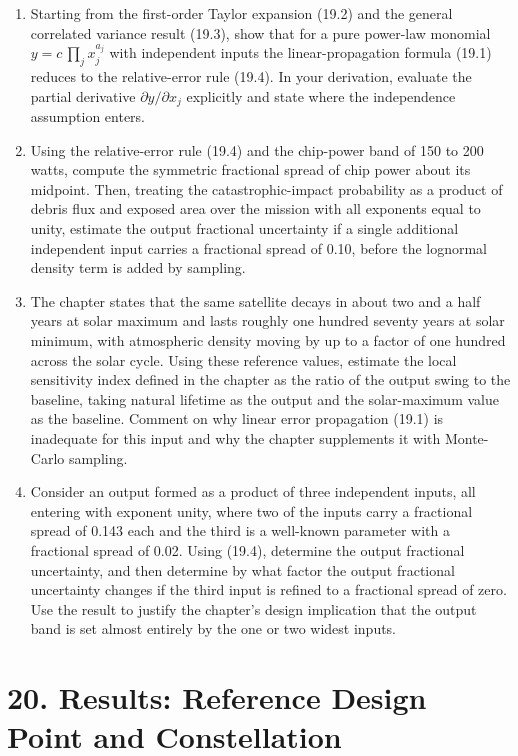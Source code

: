 \documentclass[
  11pt,
  openany,
  oneside]{book}
\begin{document}
\begin{enumerate}
\def\labelenumi{\arabic{enumi}.}
\item
  Starting from the first-order Taylor expansion (19.2) and the general
  correlated variance result (19.3), show that for a pure power-law
  monomial \(y = c\,\prod_{j} x_j^{a_j}\) with independent inputs the
  linear-propagation formula (19.1) reduces to the relative-error rule
  (19.4). In your derivation, evaluate the partial derivative
  \(\partial y/\partial x_j\) explicitly and state where the
  independence assumption enters.
\item
  Using the relative-error rule (19.4) and the chip-power band of 150 to
  200 watts, compute the symmetric fractional spread of chip power about
  its midpoint. Then, treating the catastrophic-impact probability as a
  product of debris flux and exposed area over the mission with all
  exponents equal to unity, estimate the output fractional uncertainty
  if a single additional independent input carries a fractional spread
  of 0.10, before the lognormal density term is added by sampling.
\item
  The chapter states that the same satellite decays in about two and a
  half years at solar maximum and lasts roughly one hundred seventy
  years at solar minimum, with atmospheric density moving by up to a
  factor of one hundred across the solar cycle. Using these reference
  values, estimate the local sensitivity index defined in the chapter as
  the ratio of the output swing to the baseline, taking natural lifetime
  as the output and the solar-maximum value as the baseline. Comment on
  why linear error propagation (19.1) is inadequate for this input and
  why the chapter supplements it with Monte-Carlo sampling.
\item
  Consider an output formed as a product of three independent inputs,
  all entering with exponent unity, where two of the inputs carry a
  fractional spread of 0.143 each and the third is a well-known
  parameter with a fractional spread of 0.02. Using (19.4), determine
  the output fractional uncertainty, and then determine by what factor
  the output fractional uncertainty changes if the third input is
  refined to a fractional spread of zero. Use the result to justify the
  chapter's design implication that the output band is set almost
  entirely by the one or two widest inputs.
\end{enumerate}

\chapter{20. Results: Reference Design Point and
Constellation}\label{results-reference-design-point-and-constellation}
\end{document}

